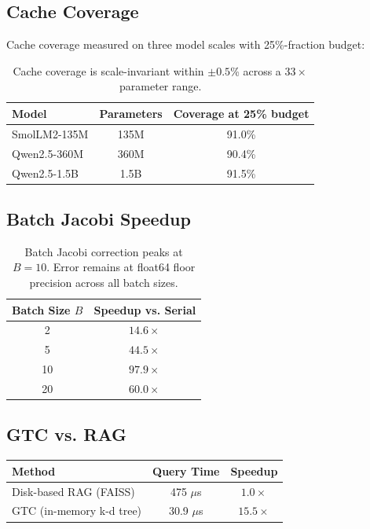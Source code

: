 \documentclass[11pt]{article}
\begin{document}
\subsection{Cache Coverage}

Cache coverage measured on three model scales with 25\%-fraction budget:

\begin{table}[h]\centering
\begin{tabular}{lcc}\toprule
Model & Parameters & Coverage at 25\% budget \\\midrule
SmolLM2-135M & 135M & 91.0\% \\
Qwen2.5-360M & 360M & 90.4\% \\
Qwen2.5-1.5B & 1.5B & 91.5\% \\\bottomrule
\end{tabular}
\caption{Cache coverage is scale-invariant within $\pm0.5$\% across a
$33\times$ parameter range.}
\end{table}

\subsection{Batch Jacobi Speedup}

\begin{table}[h]\centering
\begin{tabular}{cc}\toprule
Batch Size $B$ & Speedup vs. Serial \\\midrule
2 & $14.6\times$ \\
5 & $44.5\times$ \\
10 & $97.9\times$ \\
20 & $60.0\times$ \\\bottomrule
\end{tabular}
\caption{Batch Jacobi correction peaks at $B{=}10$. Error remains at
float64 floor precision across all batch sizes.}
\end{table}

\subsection{GTC vs. RAG}

\begin{table}[h]\centering
\begin{tabular}{lcc}\toprule
Method & Query Time & Speedup \\\midrule
Disk-based RAG (FAISS) & 475 $\mu$s & $1.0\times$ \\
GTC (in-memory k-d tree) & 30.9 $\mu$s & $15.5\times$ \\\bottomrule
\end{tabular}
\end{table}
\end{document}
